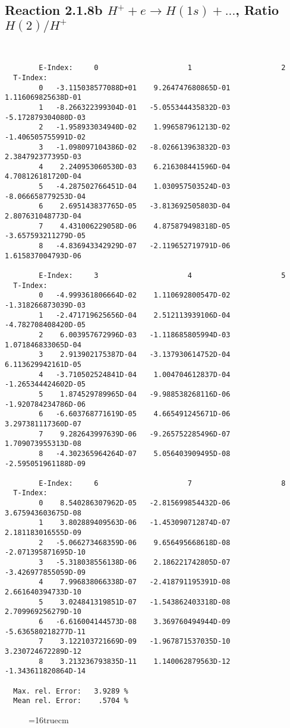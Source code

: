 \documentclass[12pt]{article}
\begin{document}
\subsection{
Reaction 2.1.8b  $H^+ + e \rightarrow H(1s) + ...$,  Ratio $H(2)/H^+$
}

\begin{small}\begin{verbatim}


        E-Index:     0                     1                     2
  T-Index:
        0   -3.115038577088D+01    9.264747680865D-01    1.116069825638D-01
        1   -8.266322399304D-01   -5.055344435832D-03   -5.172879304080D-03
        2   -1.958933034940D-02    1.996587961213D-02   -1.406505755991D-02
        3   -1.098097104386D-02   -8.026613963832D-03    2.384792377395D-03
        4    2.240953060530D-03    6.216308441596D-04    4.708126181720D-04
        5   -4.287502766451D-04    1.030957503524D-03   -8.066658779253D-04
        6    2.695143837765D-05   -3.813692505803D-04    2.807631048773D-04
        7    4.431006229058D-06    4.875879498318D-05   -3.657593211279D-05
        8   -4.836943342929D-07   -2.119652719791D-06    1.615837004793D-06

        E-Index:     3                     4                     5
  T-Index:
        0   -4.999361806664D-02    1.110692800547D-02   -1.318266873039D-03
        1   -2.471719625656D-04    2.512113939106D-04   -4.782708408420D-05
        2    6.003957672996D-03   -1.118685805994D-03    1.071846833065D-04
        3    2.913902175387D-04   -3.137930614752D-04    6.113629942161D-05
        4   -3.710502524841D-04    1.004704612837D-04   -1.265344424602D-05
        5    1.874529789965D-04   -9.988538268116D-06   -1.920784234786D-06
        6   -6.603768771619D-05    4.665491245671D-06    3.297381117360D-07
        7    9.282643997639D-06   -9.265752285496D-07    1.709073955313D-08
        8   -4.302365964264D-07    5.056403909495D-08   -2.595051961188D-09

        E-Index:     6                     7                     8
  T-Index:
        0    8.540286307962D-05   -2.815699854432D-06    3.675943603675D-08
        1    3.802889409563D-06   -1.453090712874D-07    2.181183016555D-09
        2   -5.066273468359D-06    9.656495668618D-08   -2.071395871695D-10
        3   -5.318038556138D-06    2.186221742805D-07   -3.426977855059D-09
        4    7.996838066338D-07   -2.418791195391D-08    2.661640394733D-10
        5    3.024841319851D-07   -1.543862403318D-08    2.709969256279D-10
        6   -6.616004144573D-08    3.369760494944D-09   -5.636580218277D-11
        7    3.122103721669D-09   -1.967871537035D-10    3.230724672289D-12
        8    3.213236793835D-11    1.140062879563D-12   -1.343611820864D-14

  Max. rel. Error:   3.9289 %
  Mean rel. Error:    .5704 %

\end{verbatim}\end{small}
\begin{figure} \label{2.1.8rb}
\epsfxsize=16truecm
\end{figure}
\newpage
\end{document}
